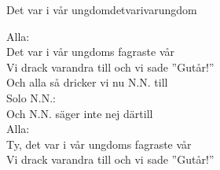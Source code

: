 \begin{song}{Det var i vår ungdom}{detvarivarungdom}
\begin{vers}
Alla:\\
Det var i vår ungdoms fagraste vår\\
Vi drack varandra till och vi sade ''Gutår!''\\
Och alla så dricker vi nu N.N. till\\
Solo N.N.:\\
Och N.N. säger inte nej därtill\\
Alla:\\
Ty, det var i vår ungdoms fagraste vår\\
Vi drack varandra till och vi sade ''Gutår!''\\
\end{vers}
\end{song}

